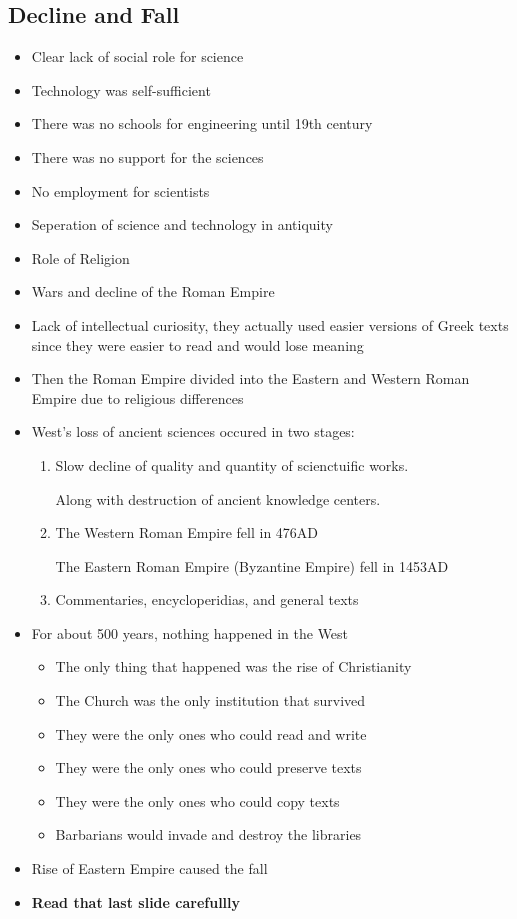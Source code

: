 \documentclass{article}
\begin{document}
\subsection{Decline and Fall}
\begin{itemize}
  \item Clear lack of social role for science
  \item Technology was self-sufficient
  \item There was no schools for engineering until 19th century
  \item There was no support for the sciences
  \item No employment for scientists
  \item Seperation of science and technology in antiquity
  \item Role of Religion
  \item Wars and decline of the Roman Empire
  \item Lack of intellectual curiosity,
    they actually used easier versions of Greek texts since
    they were easier to read and would lose meaning
  \item Then the Roman Empire divided into the Eastern and Western Roman Empire
    due to religious differences
  \item West's loss of ancient sciences occured in two stages:
    \begin{enumerate}
      \item Slow decline of quality and quantity of scienctuific works.

        Along with destruction of ancient knowledge centers.
      \item The Western Roman Empire fell in 476AD

      The Eastern Roman Empire (Byzantine Empire) fell in 1453AD
      \item Commentaries, encycloperidias, and general texts
    \end{enumerate}
  \item For about 500 years, nothing happened in the West
    \begin{itemize}
      \item The only thing that happened was the rise of Christianity
      \item The Church was the only institution that survived
      \item They were the only ones who could read and write
      \item They were the only ones who could preserve texts
      \item They were the only ones who could copy texts
      \item Barbarians would invade and destroy the libraries
    \end{itemize}
  \item Rise of Eastern Empire caused the fall
  \item \textbf{Read that last slide carefullly}
\end{itemize}
\end{document}

